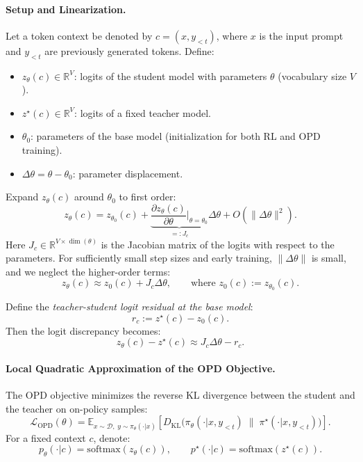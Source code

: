 \documentclass{llmxive}
\begin{document}
\paragraph{Setup and Linearization.}
Let a token context be denoted by \(c = (x, y_{<t})\), where \(x\) is the input prompt and \(y_{<t}\) are previously generated tokens.  
Define:
\begin{itemize}
    \item \(z_{\theta}(c) \in \mathbb{R}^{V}\): logits of the student model with parameters \(\theta\) (vocabulary size \(V\)).
    \item \(z^{\star}(c) \in \mathbb{R}^{V}\): logits of a fixed teacher model.
    \item \(\theta_0\): parameters of the base model (initialization for both RL and OPD training).
    \item \(\Delta\theta = \theta - \theta_0\): parameter displacement.
\end{itemize}

Expand \(z_{\theta}(c)\) around \(\theta_0\) to first order:
\begin{equation}
z_{\theta}(c) = z_{\theta_0}(c) + \underbrace{\frac{\partial z_{\theta}(c)}{\partial \theta}\bigg|_{\theta=\theta_0}}_{=: J_c} \Delta\theta + O(\|\Delta\theta\|^2).
\end{equation}
Here \(J_c \in \mathbb{R}^{V \times \dim(\theta)}\) is the Jacobian matrix of the logits with respect to the parameters.  
For sufficiently small step sizes and early training, \(\|\Delta\theta\|\) is small, and we neglect the higher-order terms:
\begin{equation}
z_{\theta}(c) \approx z_{0}(c) + J_c \Delta\theta, \qquad \text{where } z_{0}(c):=z_{\theta_0}(c).
\end{equation}

Define the \emph{teacher-student logit residual at the base model}:
\begin{equation}
r_c := z^{\star}(c) - z_{0}(c).
\end{equation}
Then the logit discrepancy becomes:
\begin{equation}
z_{\theta}(c) - z^{\star}(c) \approx J_c \Delta\theta - r_c.
\end{equation}

\paragraph{Local Quadratic Approximation of the OPD Objective.}
The OPD objective minimizes the reverse KL divergence between the student and the teacher on on-policy samples:
\begin{equation}
\mathcal{L}_{\mathrm{OPD}}(\theta) = \mathbb{E}_{x\sim\mathcal{D},\; y\sim\pi_{\theta}(\cdot|x)}\left[ D_{\mathrm{KL}}\big(\pi_{\theta}(\cdot|x,y_{<t})\;\|\; \pi^{\star}(\cdot|x,y_{<t})\big) \right].
\end{equation}
For a fixed context \(c\), denote:
\begin{equation}
p_{\theta}(\cdot|c) = \mathrm{softmax}(z_{\theta}(c)), \qquad p^{\star}(\cdot|c) = \mathrm{softmax}(z^{\star}(c)).
\end{equation}
\end{document}
